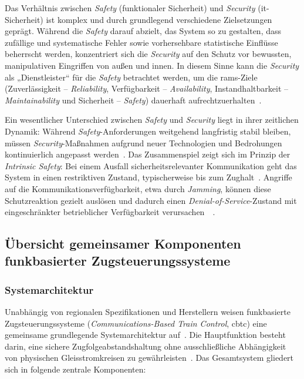 \documentclass[runningheads]{res/llncs}
\begin{document}
Das Verhältnis zwischen \textit{Safety} (funktionaler Sicherheit) und \textit{Security} (\gls{it}-Sicherheit) ist komplex und durch grundlegend verschiedene Zielsetzungen geprägt. Während die \textit{Safety} darauf abzielt, das System so zu gestalten, dass zufällige und systematische Fehler sowie vorhersehbare statistische Einflüsse beherrscht werden, konzentriert sich die \textit{Security} auf den Schutz vor bewussten, manipulativen Eingriffen von außen und innen. 
In diesem Sinne kann die \textit{Security} als „Dienstleister“ für die \textit{Safety} betrachtet werden, um die \gls{rams}-Ziele (Zuverlässigkeit -- \textit{Reliability}, Verfügbarkeit -- \textit{Availability}, Instandhaltbarkeit -- \textit{Maintainability} und Sicherheit -- \textit{Safety}) dauerhaft aufrechtzuerhalten~\parencite[S. 204]{trinckaufETCS2024}. 

Ein wesentlicher Unterschied zwischen \textit{Safety} und \textit{Security} liegt in ihrer zeitlichen Dynamik: Während \textit{Safety}-Anforderungen weitgehend langfristig stabil bleiben, müssen \textit{Security}-Maßnahmen aufgrund neuer Technologien und Bedrohungen kontinuierlich angepasst werden~\parencite[S. 204]{trinckaufETCS2024}. Das Zusammenspiel zeigt sich im Prinzip der \textit{Intrinsic Safety}: Bei einem Ausfall sicherheitsrelevanter Kommunikation geht das System in einen restriktiven Zustand, typischerweise bis zum Zughalt~\parencite[S. 56]{gaggeroSurvey2024}. Angriffe auf die Kommunikationsverfügbarkeit, etwa durch \textit{Jamming}, können diese Schutzreaktion gezielt auslösen und dadurch einen \textit{Denial-of-Service}-Zustand mit eingeschränkter betrieblicher Verfügbarkeit verursachen~\parencite[S. 207]{trinckaufETCS2024}~\parencite[S. 56, 59]{gaggeroSurvey2024}.

\subsection{Übersicht gemeinsamer Komponenten funkbasierter Zugsteuerungssysteme}
\label{sec:Übersicht_gemeinsamer_Komponenten_funkbasierter_Zugsteuerungssysteme}

\subsubsection{Systemarchitektur}
\label{sec:Systemarchitektur}
Unabhängig von regionalen Spezifikationen und Herstellern weisen funkbasierte Zugsteuerungssysteme (\textit{Communications-Based Train Control}, \gls{cbtc}) eine gemeinsame grundlegende Systemarchitektur auf~\parencite[S. 9--11]{xiangliuCyber2020}. Die Hauptfunktion besteht darin, eine sichere Zugfolgeabstandshaltung ohne ausschließliche Abhängigkeit von physischen Gleisstromkreisen zu gewährleisten~\parencite[S. 9]{xiangliuCyber2020}. Das Gesamtsystem gliedert sich in folgende zentrale Komponenten:
\end{document}
